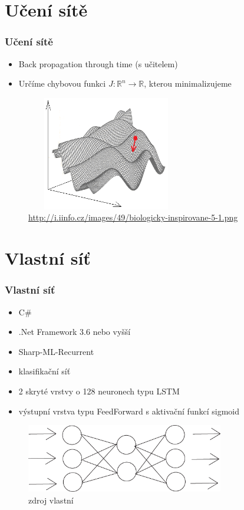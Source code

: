 \documentclass{beamer}
\begin{document}
	\section{Učení sítě}
	\begin{frame}
	\frametitle{Učení sítě}
		\begin{itemize}
			\item Back propagation through time (s učitelem)
			\item Určíme chybovou funkci $J: \mathbb{R}^n \rightarrow \mathbb{R}$, kterou minimalizujeme
		\end{itemize}
		\begin{figure}
			\centering
			\includegraphics[width=7cm, height=5cm]{backpropagation.png} %
			\caption{\fontsize{5}{6}\selectfont\url{http://i.iinfo.cz/images/49/biologicky-inspirovane-5-1.png}}	
		\end{figure}
	\end{frame}




	\section{Vlastní síť}
	\begin{frame}
	\frametitle{Vlastní síť}
		\begin{itemize}
			\item C\#
			\item .Net Framework 3.6 nebo vyšší
			\item Sharp-ML-Recurrent
			\item klasifikační síť
			\item 2 skryté vrstvy o 128 neuronech typu LSTM
			\item výstupní vrstva typu FeedForward s aktivační funkcí sigmoid
		\end{itemize}
		\begin{figure}
			\includegraphics[height=3cm]{neuralNetwork.png}
			\caption{{\fontsize{5}{6}\selectfont zdroj vlastní}}
		\end{figure}
	\end{frame}
	
\end{document}
